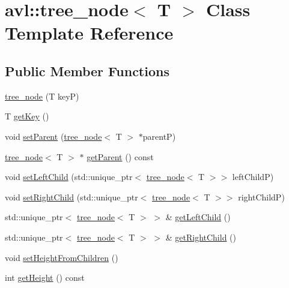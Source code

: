 \hypertarget{classavl_1_1tree__node}{}\section{avl\+:\+:tree\+\_\+node$<$ T $>$ Class Template Reference}
\label{classavl_1_1tree__node}
\subsection*{Public Member Functions}
\begin{DoxyCompactItemize}
\item 
\hyperlink{classavl_1_1tree__node_a7aec358a8e5c453e686c29b1d63c7437}{tree\+\_\+node} (T keyP)
\item 
T \hyperlink{classavl_1_1tree__node_a27d17e38312d380b79da420bbc0da99d}{get\+Key} ()
\item 
void \hyperlink{classavl_1_1tree__node_a9b62ceb3999608be2e85569208668b08}{set\+Parent} (\hyperlink{classavl_1_1tree__node}{tree\+\_\+node}$<$ T $>$ $\ast$parentP)
\item 
\hyperlink{classavl_1_1tree__node}{tree\+\_\+node}$<$ T $>$ $\ast$ \hyperlink{classavl_1_1tree__node_a3350faeaf03433fc236ffe811b41b04f}{get\+Parent} () const
\item 
void \hyperlink{classavl_1_1tree__node_a21990bf288cf0ec0572e53afbacb9b35}{set\+Left\+Child} (std\+::unique\+\_\+ptr$<$ \hyperlink{classavl_1_1tree__node}{tree\+\_\+node}$<$ T $>$$>$ left\+ChildP)
\item 
void \hyperlink{classavl_1_1tree__node_a09a51bcee333bbd509e3edb96179ae7e}{set\+Right\+Child} (std\+::unique\+\_\+ptr$<$ \hyperlink{classavl_1_1tree__node}{tree\+\_\+node}$<$ T $>$$>$ right\+ChildP)
\item 
std\+::unique\+\_\+ptr$<$ \hyperlink{classavl_1_1tree__node}{tree\+\_\+node}$<$ T $>$ $>$ \& \hyperlink{classavl_1_1tree__node_ad12a5f6a41cfc6203913c5b6bce30837}{get\+Left\+Child} ()
\item 
std\+::unique\+\_\+ptr$<$ \hyperlink{classavl_1_1tree__node}{tree\+\_\+node}$<$ T $>$ $>$ \& \hyperlink{classavl_1_1tree__node_ac79592e64351573e622d0977002fc813}{get\+Right\+Child} ()
\item 
void \hyperlink{classavl_1_1tree__node_a5e3b8788433571c4b8462d2cf2d689b9}{set\+Height\+From\+Children} ()
\item 
int \hyperlink{classavl_1_1tree__node_ab298d8df03ff6414ff7280bbdbb16e8a}{get\+Height} () const
\item 

\end{DoxyCompactItemize}
